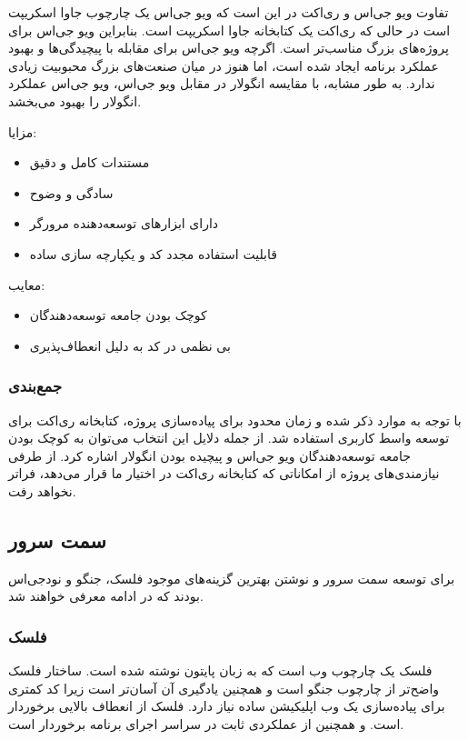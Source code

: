 تفاوت ویو جی‌اس و ری‌اکت در این است که ویو جی‌اس یک چارچوب جاوا اسکریپت است در حالی که ری‌اکت یک کتابخانه جاوا اسکریپت است. بنابراین ویو جی‌اس برای پروژه‌های بزرگ مناسب‌تر است. اگرچه ویو جی‌اس برای مقابله با پیچیدگی‌ها و بهبود عملکرد برنامه ایجاد شده است، اما هنوز در میان صنعت‌های بزرگ محبوبیت زیادی ندارد. به طور مشابه، با مقایسه انگولار در مقابل ویو جی‌اس، ویو جی‌اس عملکرد انگولار را بهبود می‌بخشد.


مزایا:
\begin{itemize}
    \item مستندات کامل و دقیق
    \item سادگی و وضوح
    \item دارای ابزارهای توسعه‌دهنده مرورگر
    \item قابلیت استفاده مجدد کد و یکپارچه سازی ساده
\end{itemize}

معایب:

\begin{itemize}
    \item کوچک بودن جامعه توسعه‌دهندگان
    \item بی نظمی در کد به دلیل انعطاف‌پذیری 
\end{itemize}


\subsubsection{جمع‌بندی}

با توجه به موارد ذکر شده و زمان محدود برای پیاده‌سازی پروژه، کتابخانه ری‌اکت برای توسعه واسط کاربری استفاده شد. از جمله دلایل این انتخاب می‌توان به کوچک بودن جامعه توسعه‌دهندگان ویو جی‌اس و پیچیده بودن انگولار اشاره کرد. از طرفی نیازمندی‌های پروژه از امکاناتی که کتابخانه ری‌اکت در اختیار ما قرار می‌دهد، فراتر نخواهد رفت.


\subsection{سمت سرور}
برای توسعه سمت سرور و نوشتن  بهترین گزینه‌های موجود فلسک، جنگو و نودجی‌اس بودند که در ادامه معرفی خواهند شد.

\subsubsection{فلسک}
فلسک یک چارچوب وب است که به زبان پایتون نوشته شده است. ساختار فلسک واضح‌تر از چارچوب جنگو است و همچنین یادگیری آن آسان‌تر است زیرا کد کمتری برای پیاده‌سازی یک وب اپلیکیشن ساده نیاز دارد. فلسک از انعطاف بالایی برخوردار است. و همچنین از عملکردی ثابت در سراسر اجرای برنامه برخوردار است.

